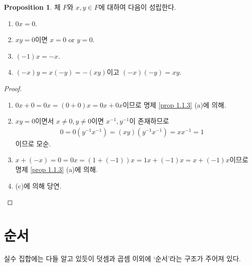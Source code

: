 \documentclass[11pt]{book}
\numberwithin{equation}{chapter}
\theoremstyle{definition}
\newtheorem{prop}[thm]{Proposition}
\begin{document}
\begin{prop}
    체 \(F\)와 \(x, y \in F\)에 대하여 다음이 성립한다.
    \begin{enumerate} [label=(\alph*), leftmargin=2\parindent]
        \item
        \(0x = 0\).
        \item
        \(xy = 0\)이면 \(x = 0\) or \(y = 0\).
        \item
        \((-1)x = -x\).
        \item
        \((-x)y = x(-y) = -(xy)\)이고 \((-x)(-y)=xy\).
    \end{enumerate}
\end{prop}
\begin{proof}
    \quad

    \begin{enumerate} [label=(\alph*), leftmargin=2\parindent]
        \item
        \(0x + 0 = 0x = (0+0)x = 0x + 0x\)이므로 명제 \ref{prop 1.1.3} (a)에 의해.
        \item
        \(xy = 0\)이면서 \(x \neq 0, y \neq 0\)이면 \(x^{-1}, y^{-1}\)이 존재하므로
    \begin{gather*}
        0 = 0(y^{-1}x^{-1}) = (xy)(y^{-1}x^{-1}) = xx^{-1} = 1
    \end{gather*}
    이므로 모순.
        \item
        \(x + (-x) = 0 = 0x = (1 + (-1))x = 1x + (-1)x = x + (-1)x\)이므로 명제 \ref{prop 1.1.3} (a)에 의해.
        \item
        (c)에 의해 당연.
    \end{enumerate}
\end{proof}

\section{순서}

실수 집합에는 다들 알고 있듯이 덧셈과 곱셈 이외에 `순서'라는 구조가 주어져 있다.
\end{document}
